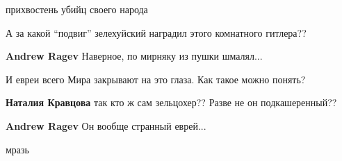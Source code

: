 \begin{itemize}
прихвостень убийц своего народа

А за какой \enquote{подвиг} зелехуйский наградил этого комнатного гитлера??

\begin{itemize} %
\textbf{Andrew Ragev} Наверное, по мирняку из пушки шмалял...

И евреи всего Мира закрывают на это глаза. Как такое можно понять?

\textbf{Наталия Кравцова} так кто ж сам зельцохер?? Разве не он подкашеренный??

\textbf{Andrew Ragev} Он вообще странный еврей...
\end{itemize} %

мразь


\end{itemize} %
